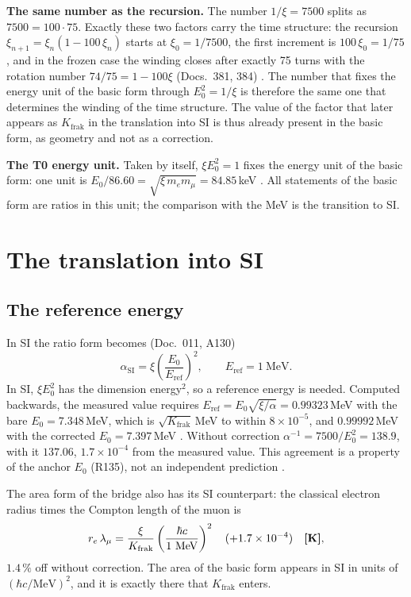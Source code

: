 \textbf{The same number as the recursion.} The number $1/\xi=7500$ splits as $7500=100\cdot75$.
Exactly these two factors carry the time structure: the recursion $\xi_{n+1}=\xi_n(1-100\,\xi_n)$
starts at $\xi_0=1/7500$, the first increment is $100\,\xi_0=1/75$, and in the frozen case the
winding closes after exactly 75 turns with the rotation number $74/75=1-100\xi$ (Docs.~381, 384)
\BM. The number that fixes the energy unit of the basic form through $E_0^2=1/\xi$ is therefore the
same one that determines the winding of the time structure. The value of the factor that later
appears as $K_{\text{frak}}$ in the translation into SI is thus already present in the basic form,
as geometry and not as a correction.

\textbf{The T0 energy unit.} Taken by itself, $\xi E_0^2=1$ fixes the energy unit of the basic
form: one unit is $E_0/86.60=\sqrt{\xi\,m_em_\mu}=84.85$\,keV \KM. All statements of the basic form
are ratios in this unit; the comparison with the MeV is the transition to SI.

\section{The translation into SI}

\subsection{The reference energy}

In SI the ratio form becomes (Doc.~011, A130)
\begin{equation}
  \alpha_{\text{SI}}=\xi\left(\frac{E_0}{E_{\text{ref}}}\right)^2,\qquad E_{\text{ref}}=1\ \text{MeV}.
\end{equation}
In SI, $\xi E_0^2$ has the dimension energy$^2$, so a reference energy is needed. Computed
backwards, the measured value requires $E_{\text{ref}}=E_0\sqrt{\xi/\alpha}=0.99323$\,MeV with the
bare $E_0=7.348$\,MeV, which is $\sqrt{K_{\text{frak}}}$\,MeV to within $8\times10^{-5}$, and
$0.99992$\,MeV with the corrected $E_0=7.397$\,MeV \KM. Without correction
$\alpha^{-1}=7500/E_0^2=138.9$, with it $137.06$, $1.7\times10^{-4}$ from the measured value. This
agreement is a property of the anchor $E_0$ (R135), not an independent prediction \KM.

The area form of the bridge also has its SI counterpart: the classical electron radius times the
Compton length of the muon is
\begin{equation}
  r_e\,\lambda_\mu=\frac{\xi}{K_{\text{frak}}}\left(\frac{\hbar c}{1\ \text{MeV}}\right)^2
  \quad(+1.7\times10^{-4})\quad\textbf{[K]} ,
\end{equation}
$1.4\,\%$ off without correction. The area of the basic form appears in SI in units of
$(\hbar c/\text{MeV})^2$, and it is exactly there that $K_{\text{frak}}$ enters.


